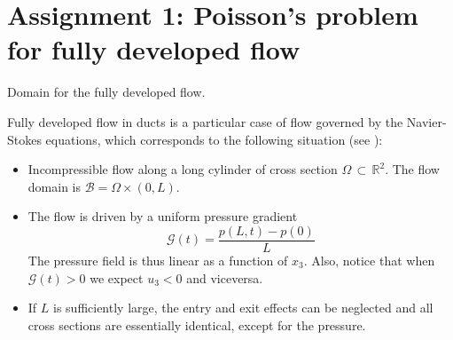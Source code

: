 \section{{\color{gray!50!blue} Assignment 1: Poisson's problem for fully developed flow}}

\begin{marginfigure}[-6.0cm]
\scalebox{0.8}{}
       \caption[]{Domain for the fully developed flow.} 
\end{marginfigure}

\begin{kaobox}
Fully developed flow in ducts is a particular case of flow governed by the
Navier-Stokes equations, which corresponds to the following situation
(see ):
\begin{itemize}
\item Incompressible flow along a long cylinder of 
cross section $\Omega\,\subset\,\mathbb{R}^2$. The flow
domain is $\mathcal{B}=\Omega\times (0,L)$.\\
\item The flow is driven by a uniform pressure gradient
\begin{equation}
\mathcal{G}(t)=\frac{p(L,t)-p(0)}{L}
\end{equation}
The pressure field is thus linear as a function of $x_3$.
Also, notice that when $\mathcal{G}(t)>0$ we expect $u_3<0$ and
viceversa. 
\\
\item If $L$ is sufficiently large, the entry and exit effects
can be neglected and all cross sections are essentially identical,
except for the pressure.\\



\end{itemize}
\end{kaobox}
